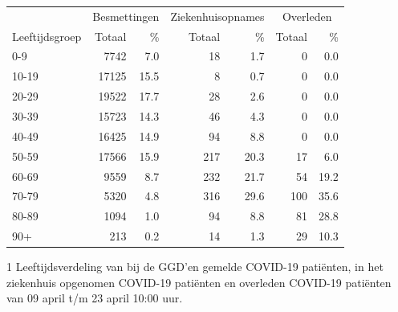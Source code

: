 \documentclass[
  english,
  man,floatsintext]{apa6}
\begin{document}
\begin{table}
\centering\begingroup\fontsize{11}{13}\selectfont

\begin{threeparttable}
\begin{tabular}{lrrrrrr}
\toprule
\multicolumn{1}{c}{ } & \multicolumn{2}{c}{Besmettingen} & \multicolumn{2}{c}{Ziekenhuisopnames} & \multicolumn{2}{c}{Overleden} \\
\cmidrule(l{3pt}r{3pt}){2-3} \cmidrule(l{3pt}r{3pt}){4-5} \cmidrule(l{3pt}r{3pt}){6-7}
Leeftijdsgroep & Totaal & \% & Totaal & \% & Totaal & \%\\
\midrule
0-9 & 7742 & 7.0 & 18 & 1.7 & 0 & 0.0\\
10-19 & 17125 & 15.5 & 8 & 0.7 & 0 & 0.0\\
20-29 & 19522 & 17.7 & 28 & 2.6 & 0 & 0.0\\
30-39 & 15723 & 14.3 & 46 & 4.3 & 0 & 0.0\\
40-49 & 16425 & 14.9 & 94 & 8.8 & 0 & 0.0\\
50-59 & 17566 & 15.9 & 217 & 20.3 & 17 & 6.0\\
60-69 & 9559 & 8.7 & 232 & 21.7 & 54 & 19.2\\
70-79 & 5320 & 4.8 & 316 & 29.6 & 100 & 35.6\\
80-89 & 1094 & 1.0 & 94 & 8.8 & 81 & 28.8\\
90+ & 213 & 0.2 & 14 & 1.3 & 29 & 10.3\\
\bottomrule
\end{tabular}
\begin{tablenotes}
\item[1] Leeftijdsverdeling van bij de GGD’en gemelde COVID-19 patiënten, in het ziekenhuis opgenomen COVID-19 patiënten en overleden COVID-19 patiënten van 09 april t/m 23 april 10:00 uur.
\end{tablenotes}
\end{threeparttable}
\endgroup{}
\end{table}

\newpage
\end{document}
